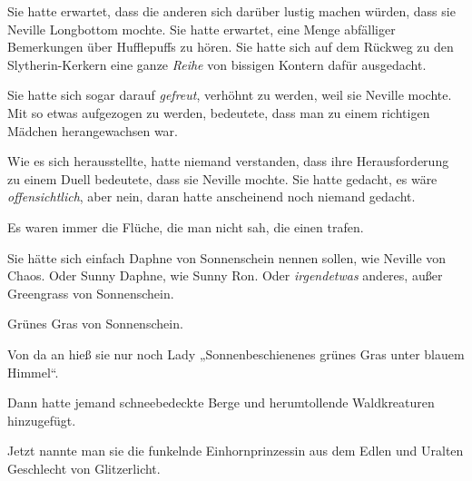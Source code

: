 Sie hatte erwartet, dass die anderen sich darüber lustig machen würden, dass sie Neville Longbottom mochte. Sie hatte erwartet, eine Menge abfälliger Bemerkungen über Hufflepuffs zu hören. Sie hatte sich auf dem Rückweg zu den Slytherin-Kerkern eine ganze \emph{Reihe} von bissigen Kontern dafür ausgedacht.

Sie hatte sich sogar darauf \emph{gefreut}, verhöhnt zu werden, weil sie Neville mochte. Mit so etwas aufgezogen zu werden, bedeutete, dass man zu einem richtigen Mädchen herangewachsen war.

Wie es sich herausstellte, hatte niemand verstanden, dass ihre Herausforderung zu einem Duell bedeutete, dass sie Neville mochte. Sie hatte gedacht, es wäre \emph{offensichtlich}, aber nein, daran hatte anscheinend noch niemand gedacht.

Es waren immer die Flüche, die man nicht sah, die einen trafen.

Sie hätte sich einfach Daphne von Sonnenschein nennen sollen, wie Neville von Chaos. Oder Sunny Daphne, wie Sunny Ron. Oder \emph{irgendetwas} anderes, außer Greengrass von Sonnenschein.

Grünes Gras von Sonnenschein.

Von da an hieß sie nur noch Lady „Sonnenbeschienenes grünes Gras unter blauem Himmel“.

Dann hatte jemand schneebedeckte Berge und herumtollende Waldkreaturen hinzugefügt.

Jetzt nannte man sie die funkelnde Einhornprinzessin aus dem Edlen und Uralten Geschlecht von Glitzerlicht.

